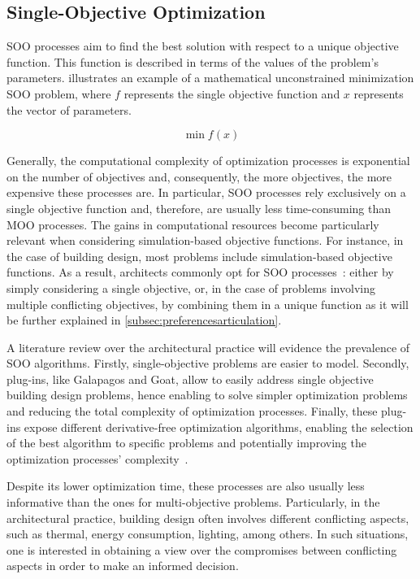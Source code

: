 	\subsection{Single-Objective Optimization}
	
	\ac{SOO} processes aim to find the best solution with respect to a unique objective function. This function is described in terms of the values of the problem's parameters.  illustrates an example of a mathematical unconstrained minimization \ac{SOO} problem, where $f$ represents the single objective function and $x$ represents the vector of parameters.
	
	\begin{equation} \label{eq:soo}
	\min f(x) 
	\end{equation}
	
	Generally, the computational complexity of optimization processes is exponential on the number of objectives and, consequently, the more objectives, the more expensive these processes are. In particular, \ac{SOO} processes rely exclusively on a single objective function and, therefore, are usually less time-consuming than \ac{MOO} processes. The gains in computational resources become particularly relevant when considering simulation-based objective functions. For instance, in the case of building design, most problems include simulation-based objective functions. As a result, architects commonly opt for \ac{SOO} processes~\cite{Wortmann2017Opossum}: either by simply considering a single objective, or, in the case of problems involving multiple conflicting objectives, by combining them in a unique function as it will be further explained in \cref{subsec:preferencesarticulation}.
	
	A literature review over the architectural practice will evidence the prevalence of \ac{SOO} algorithms. Firstly, single-objective problems are easier to model. Secondly, plug-ins, like Galapagos and Goat, allow to easily address single objective building design problems, hence enabling to solve simpler optimization problems and reducing the total complexity of optimization processes. Finally, these plug-ins expose different derivative-free optimization algorithms, enabling the selection of the best algorithm to specific problems and potentially improving the optimization processes' complexity~\cite{Wortmann2016BBO}. 
	
	Despite its lower optimization time, these processes are also usually less informative than the ones for multi-objective problems. Particularly, in the architectural practice, building design often involves different conflicting aspects, such as thermal, energy consumption, lighting, among others. In such situations, one is interested in obtaining a view over the compromises between conflicting aspects in order to make an informed decision.
	
